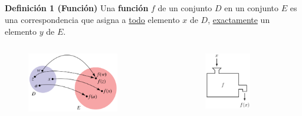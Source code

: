 
\subsection{}

{\nologo
\begin{frame}%

\begin{block}{\textbf{Definición 1 (Función)}}
	\justifying
	Una \textbf{función} $f$ de un conjunto $D$ en un conjunto $E$ es una correspondencia que asigna a \underline{todo} elemento $x$ de $D$, 
	\underline{exactamente} un elemento $y$ de $E$.
	
	\vspace{-5mm}
	
	\begin{columns}
		\hspace{5mm}
		\begin{column}{0.5\textwidth}
			\begin{figure}[H]
				\centering
				\includegraphics[width=4cm]{imagenes/funcion1}
			\end{figure}   
		\end{column}
		\begin{column}{0.4\textwidth}  %
			\begin{figure}[H]
				\centering
				\includegraphics[width=2cm]{imagenes/funcion2}
			\end{figure}   
		\end{column}
	\end{columns}
	

\end{block}
\end{frame}}
